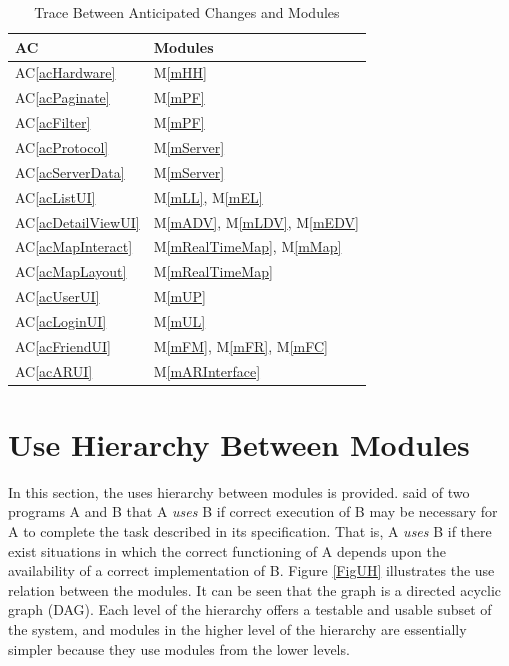 \documentclass[12pt, titlepage]{article}
\newcommand{\acref}[1]{AC\ref{#1}}
\newcommand{\mref}[1]{M\ref{#1}}
\begin{document}
\begin{table}[H]
\centering
\begin{tabular}{p{} p{}}
\toprule
\textbf{AC} & \textbf{Modules}\\
\midrule
\acref{acHardware} & \mref{mHH}\\
\acref{acPaginate} & \mref{mPF}\\
\acref{acFilter} & \mref{mPF}\\
\acref{acProtocol} & \mref{mServer}\\
\acref{acServerData} & \mref{mServer}\\
\acref{acListUI} & \mref{mLL}, \mref{mEL}\\
\acref{acDetailViewUI} & \mref{mADV}, \mref{mLDV}, \mref{mEDV}\\
\acref{acMapInteract} & \mref{mRealTimeMap}, \mref{mMap}\\
\acref{acMapLayout} & \mref{mRealTimeMap}\\
\acref{acUserUI} & \mref{mUP}\\
\acref{acLoginUI} & \mref{mUL}\\
\acref{acFriendUI} & \mref{mFM}, \mref{mFR}, \mref{mFC}\\
\acref{acARUI} & \mref{mARInterface}\\
\bottomrule
\end{tabular}
\caption{Trace Between Anticipated Changes and Modules}
\label{TblACT}
\end{table}

\section{Use Hierarchy Between Modules} \label{SecUse}

In this section, the uses hierarchy between modules is
provided. \citet{Parnas1978} said of two programs A and B that A {\em uses} B if
correct execution of B may be necessary for A to complete the task described in
its specification. That is, A {\em uses} B if there exist situations in which
the correct functioning of A depends upon the availability of a correct
implementation of B.  Figure \ref{FigUH} illustrates the use relation between
the modules. It can be seen that the graph is a directed acyclic graph
(DAG). Each level of the hierarchy offers a testable and usable subset of the
system, and modules in the higher level of the hierarchy are essentially simpler
because they use modules from the lower levels.
\end{document}
